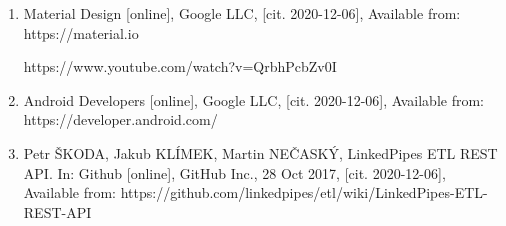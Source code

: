
\begin{enumerate}
    \item Material Design [online], Google LLC, [cit. 2020-12-06], Available from: https://material.io
    
    https://www.youtube.com/watch?v=QrbhPcbZv0I
    \item Android Developers [online], Google LLC, [cit. 2020-12-06], Available from: https://developer.android.com/
    \item Petr ŠKODA, Jakub KLÍMEK, Martin NEČASKÝ, LinkedPipes ETL REST API. In: Github [online], GitHub Inc., 28 Oct 2017, [cit. 2020-12-06], Available from: https://github.com/linkedpipes/etl/wiki/LinkedPipes-ETL-REST-API
\end{enumerate}